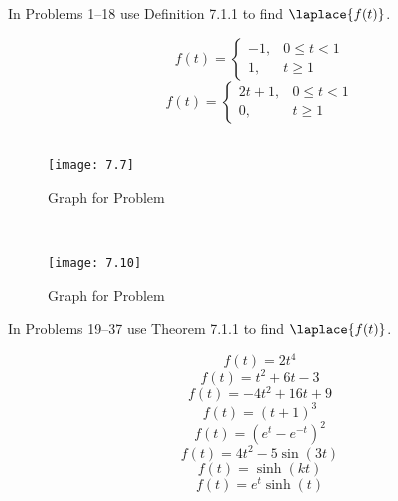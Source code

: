 \documentclass[12pt]{report}
\begin{document}
In Problems 1--18 use Definition 7.1.1 to find $\laplace \{ f(t) \}$.
\begin{enumerate}[label=\arabic*.]
	\problem \[ f(t) = \left\{ \begin{array}{rr}
		-1, & 0 \leq t < 1\\
		1,	& t \geq 1
	\end{array} \right. \] %
	\setcounter{enumi}{3}
	\problem \[ f(t) = \left\{ \begin{array}{rr}
		2t+1, & 0 \leq t < 1\\
		0, & t \geq 1
	\end{array} \right. \] %
	\setcounter{enumi}{6}
	\problem~\begin{figure}[H]
				 \centering
				 \texttt{[image: 7.7]}
				 \caption{Graph for Problem }
				 \label{fig:7}
	\end{figure} %
	\setcounter{enumi}{9}
	\problem~\begin{figure}[H]
				 \centering
				 \texttt{[image: 7.10]}
				 \caption{Graph for Problem }
				 \label{fig:10}
	\end{figure} %
\end{enumerate}

In Problems 19--37 use Theorem 7.1.1 to find $\laplace \{ f(t) \}$.
\begin{enumerate}[label=\arabic*.,start=19]
	\problem \[ f(t) = 2t^{4} \] %
	\setcounter{enumi}{22}
	\problem \[ f(t) = t^{2} + 6t - 3 \] %
	\problem \[ f(t) = -4t^{2} + 16t + 9 \] %
	\problem \[ f(t) = (t+1)^{3} \] %
	\setcounter{enumi}{29}
	\problem \[ f(t) = (e^{t}-e^{-t})^{2} \] %
	\problem \[ f(t) = 4t^{2} - 5\sin(3t) \] %
	\setcounter{enumi}{32}
	\problem \[ f(t) = \sinh(kt) \] %
	\setcounter{enumi}{34}
	\problem \[ f(t) = e^{t}\sinh(t) \] %
\end{enumerate}
\end{document}
